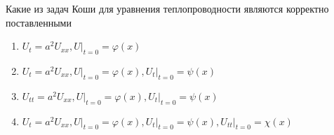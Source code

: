 Какие из задач Коши для уравнения теплопроводности являются корректно поставленными

\begin{enumerate}[label=\arabic*)]
    \item \(U_t=a^2U_{xx} , U\vert _{t=0}=\varphi \left(x\right)\)
    \item \(U_t=a^2U_{xx} , U\vert _{t=0}=\varphi (x ), U_t\vert _{t=0}=\psi (x)\)
    \item \(U_{tt}=a^2U_{xx} , U\vert _{t=0}=\varphi (x ), U_t\vert _{t=0}=\psi (x)\)
    \item \(U_t=a^2U_{xx} , U\vert _{t=0}=\varphi \left(x\right) , U_t\vert _{t=0}=\psi \left(x\right) , U_{tt}\vert _{t=0}=\chi \left(x\right)\)
\end{enumerate}

